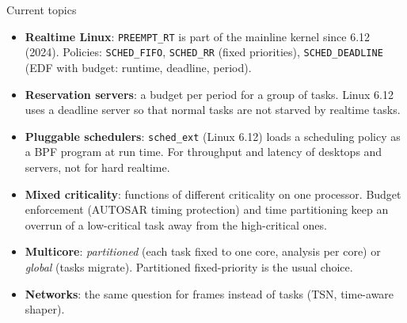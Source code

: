 \begin{frame}{Current topics}
  \begin{itemize}
    \item \textbf{Realtime Linux}: \texttt{PREEMPT\_RT} is part of the mainline kernel since 6.12 (2024). Policies: \texttt{SCHED\_FIFO}, \texttt{SCHED\_RR} (fixed priorities), \texttt{SCHED\_DEADLINE} (EDF with budget: runtime, deadline, period).
    \item \textbf{Reservation servers}: a budget per period for a group of tasks. Linux 6.12 uses a deadline server so that normal tasks are not starved by realtime tasks.
    \item \textbf{Pluggable schedulers}: \texttt{sched\_ext} (Linux 6.12) loads a scheduling policy as a BPF program at run time. For throughput and latency of desktops and servers, not for hard realtime.
    \item \textbf{Mixed criticality}: functions of different criticality on one processor. Budget enforcement (AUTOSAR timing protection) and time partitioning keep an overrun of a low-critical task away from the high-critical ones.
    \item \textbf{Multicore}: \emph{partitioned} (each task fixed to one core, analysis per core) or \emph{global} (tasks migrate). Partitioned fixed-priority is the usual choice.
    \item \textbf{Networks}: the same question for frames instead of tasks (TSN, time-aware shaper).
  \end{itemize}
\end{frame}

